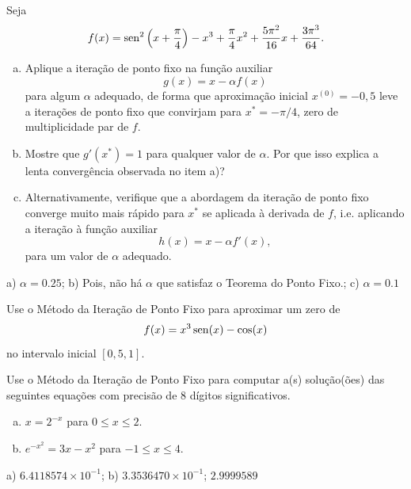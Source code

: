\begin{exer}
  Seja
  \begin{equation}
    f(x) = \operatorname{sen}^2\left(x+\frac{\pi}{4}\right) - x^3 + \frac{\pi}{4}x^2 + \frac{5\pi^2}{16}x + \frac{3\pi^3}{64}.
  \end{equation}
  \begin{enumerate}[a)]
  \item Aplique a iteração de ponto fixo na função auxiliar
    \begin{equation}
      g(x) = x - \alpha f(x)
    \end{equation}
    para algum $\alpha$ adequado, de forma que aproximação inicial $x^{(0)}=-0,5$ leve a iterações de ponto fixo que convirjam para $x^*=-\pi/4$, zero de multiplicidade par de $f$.
  \item Mostre que $g'(x^*) = 1$ para qualquer valor de $\alpha$. Por que isso explica a lenta convergência observada no item a)?
  \item Alternativamente, verifique que a abordagem da iteração de ponto fixo converge muito mais rápido para $x^*$ se aplicada à derivada de $f$, i.e. aplicando a iteração à função auxiliar
    \begin{equation}
      h(x) = x - \alpha f'(x),
    \end{equation}
    para um valor de $\alpha$ adequado.
  \end{enumerate}
\end{exer}
\begin{resp}
  a) $\alpha = 0.25$; b) Pois, não há $\alpha$ que satisfaz o Teorema do Ponto Fixo.; c) $\alpha = 0.1$
\end{resp}

\begin{exer}
  Use o Método da Iteração de Ponto Fixo para aproximar um zero de
  \begin{equation}
    f(x)=x^3\operatorname{sen}(x)-\cos(x)
  \end{equation}
  no intervalo inicial $[0,5, 1]$.
\end{exer}

\begin{exer}
  Use o Método da Iteração de Ponto Fixo para computar a(s) solução(ões) das seguintes equações com precisão de 8 dígitos significativos.
  \begin{enumerate}[a)]
  \item $x = 2^{-x}$ para $0\leq x \leq 2$.
  \item $e^{-x^2} = 3x - x^2$ para $-1\leq x\leq 4$.
  \end{enumerate}
\end{exer}
\begin{resp}
  a) $6.4118574\times 10^{-1}$; b) $3.3536470\times 10^{-1}$; $2.9999589$
\end{resp}

